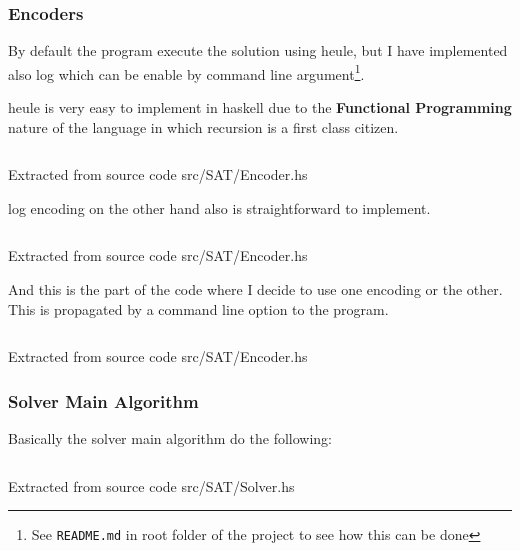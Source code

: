 \documentclass[12pt, a4paper]{article}
\begin{document}
\subsubsection{Encoders}
By default the program execute the solution using \acrfull{heule}, but I have implemented also \acrfull{log} which can be enable by command line argument\footnote{See \texttt{README.md} in root folder of the project to see how this can be done}.

\acrlong{heule} is very easy to implement in \acrshort{haskell} due to the \textbf{Functional Programming} nature of the language in which recursion is a first class citizen.

\begin{listing}[H]
  \inputminted[firstline=54, lastline=73, linenos, breaklines]{haskell}{../src/SAT/Encoder.hs}
  \caption{Extracted from source code src/SAT/Encoder.hs}
  \label{src:sat:2}
\end{listing}

\acrlong{log} encoding on the other hand also is straightforward to implement.

\begin{listing}[H]
  \inputminted[firstline=76, lastline=85, linenos, breaklines]{haskell}{../src/SAT/Encoder.hs}
  \caption{Extracted from source code src/SAT/Encoder.hs}
  \label{src:sat:3}
\end{listing}

And this is the part of the code where I decide to use one encoding or the other. This is propagated by a command line option to the program.

\begin{listing}[H]
  \inputminted[firstline=49, lastline=52, linenos, breaklines]{haskell}{../src/SAT/Encoder.hs}
  \caption{Extracted from source code src/SAT/Encoder.hs}
  \label{src:sat:4}
\end{listing}

\subsubsection{Solver Main Algorithm}
Basically the solver main algorithm do the following:

\begin{listing}[H]
  \inputminted[firstline=33, lastline=44, linenos, breaklines]{haskell}{../src/SAT/Solver.hs}
  \caption{Extracted from source code src/SAT/Solver.hs}
  \label{src:sat:5}
\end{listing}
\end{document}
